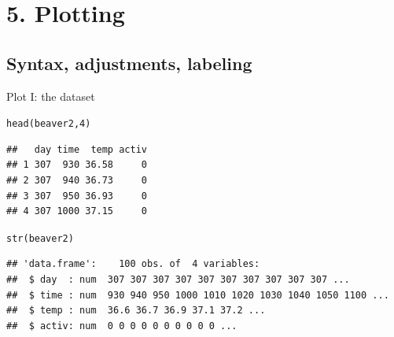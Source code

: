 \documentclass[xcolor=table,       handout,    xcolor=dvipsnames]{beamer}\usepackage[]{graphicx}\usepackage[]{color}
\makeatletter
\newcommand{\hlnum}[1]{\textcolor[rgb]{0,0,0}{#1}}
\newcommand{\hlcom}[1]{\textcolor[rgb]{0,0.392,0}{\textit{#1}}}
\newcommand{\hlopt}[1]{\textcolor[rgb]{0,0,0}{#1}}
\newcommand{\hlstd}[1]{\textcolor[rgb]{0,0,0}{#1}}
\newcommand{\hlkwd}[1]{\textcolor[rgb]{0,0,1}{#1}}
\newenvironment{kframe}{%
 \def\at@end@of@kframe{}%
 \ifinner\ifhmode%
  \def\at@end@of@kframe{\end{minipage}}%
  \begin{minipage}{\columnwidth}%
 \fi\fi%
 \def\FrameCommand##1{\hskip\@totalleftmargin \hskip-\fboxsep
 \colorbox{shadecolor}{##1}\hskip-\fboxsep
     \hskip-\linewidth \hskip-\@totalleftmargin \hskip\columnwidth}%
 \MakeFramed {\advance\hsize-\width
   \@totalleftmargin\z@ \linewidth\hsize
   \@setminipage}}%
 {\par\unskip\endMakeFramed%
 \at@end@of@kframe}
\newenvironment{knitrout}{}{} %
\newcommand{\rcode}[1]{\texttt{\textcolor{Blue}{#1}}} %
\makeatother
\begin{document}
\section{5. Plotting}

\subsection{Syntax, adjustments, labeling}

\begin{frame}[fragile]{Plot I: the dataset}
\begin{knitrout}\footnotesize
{}\color{fgcolor}\begin{kframe}
\begin{alltt}
\hlkwd{head}\hlstd{(beaver2,} \hlnum{4}\hlstd{)}
\end{alltt}
\begin{verbatim}
##   day time  temp activ
## 1 307  930 36.58     0
## 2 307  940 36.73     0
## 3 307  950 36.93     0
## 4 307 1000 37.15     0
\end{verbatim}
\begin{alltt}
\hlkwd{str}\hlstd{(beaver2)}
\end{alltt}
\begin{verbatim}
## 'data.frame':	100 obs. of  4 variables:
##  $ day  : num  307 307 307 307 307 307 307 307 307 307 ...
##  $ time : num  930 940 950 1000 1010 1020 1030 1040 1050 1100 ...
##  $ temp : num  36.6 36.7 36.9 37.1 37.2 ...
##  $ activ: num  0 0 0 0 0 0 0 0 0 0 ...
\end{verbatim}
\end{kframe}
\end{knitrout}
\end{frame}


\end{document}
